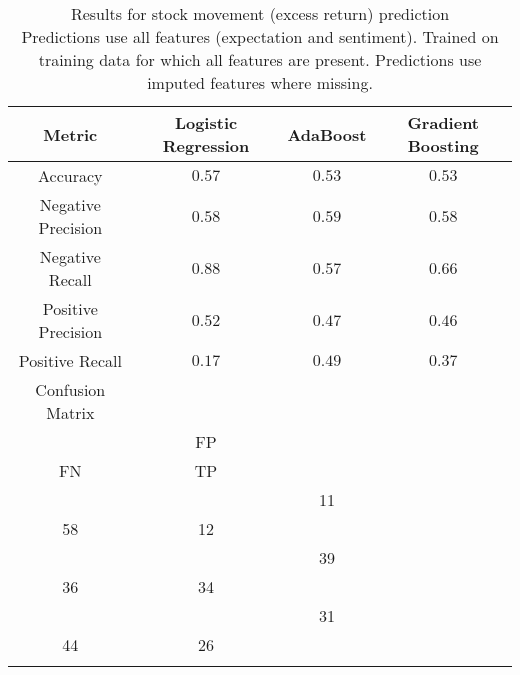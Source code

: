 \documentclass{article}
\begin{document}
\begin{table}[h]
\centering
\begin{tabular}{|c|c|c|c|}
\hline
\textbf{Metric} & \textbf{Logistic Regression} & \textbf{AdaBoost} & \textbf{Gradient Boosting} \\
\hline
Accuracy & $0.57$ & $0.53$ & $0.53$ \\
\hline
Negative Precision & $0.58$ & $0.59$ & $0.58$ \\
\hline
Negative Recall & $0.88$ & $0.57$ & $0.66$ \\
\hline
Positive Precision & $0.52$ & $0.47$ & $0.46$ \\
\hline
Positive Recall & $0.17$ & $0.49$ & $0.37$ \\
\hline
Confusion Matrix \\
\(
\begin{bmatrix}
TN & FP \\
FN & TP \\
\end{bmatrix}
\)
&
\(
\begin{bmatrix}
80 & 11 \\
58 & 12 \\
\end{bmatrix}
\)
&
\(
\begin{bmatrix}
52 & 39 \\
36 & 34 \\
\end{bmatrix}
\)
&
\(
\begin{bmatrix}
60 & 31 \\
44 & 26 \\
\end{bmatrix}
\)
\\
\end{tabular}
\caption{Results for stock movement (excess return) prediction\\
Predictions use all features (expectation and sentiment). Trained on training data for which all features are present. Predictions use imputed features where missing.}
\label{tab:excess_return_prediction}
\end{table}
\end{document}
